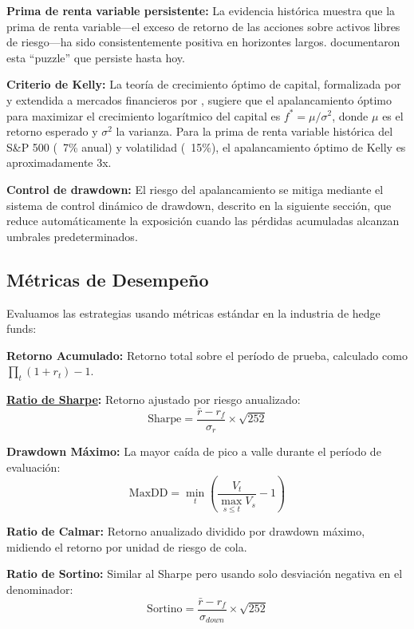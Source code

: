 \documentclass[11pt,a4paper]{article}
\newcommand{\gterm}[2]{\hyperref[glos:#1]{#2}}
\begin{document}
\textbf{Prima de renta variable persistente:} La evidencia histórica muestra que la prima de renta variable---el exceso de retorno de las acciones sobre activos libres de riesgo---ha sido consistentemente positiva en horizontes largos. \citet{mehra1985} documentaron esta ``puzzle'' que persiste hasta hoy.

\textbf{Criterio de Kelly:} La teoría de crecimiento óptimo de capital, formalizada por \citet{kelly1956} y extendida a mercados financieros por \citet{thorp2006}, sugiere que el apalancamiento óptimo para maximizar el crecimiento logarítmico del capital es $f^* = \mu/\sigma^2$, donde $\mu$ es el retorno esperado y $\sigma^2$ la varianza. Para la prima de renta variable histórica del S\&P 500 (~7\% anual) y volatilidad (~15\%), el apalancamiento óptimo de Kelly es aproximadamente 3x.

\textbf{Control de drawdown:} El riesgo del apalancamiento se mitiga mediante el sistema de control dinámico de drawdown, descrito en la siguiente sección, que reduce automáticamente la exposición cuando las pérdidas acumuladas alcanzan umbrales predeterminados.

\subsection{Métricas de Desempeño}

Evaluamos las estrategias usando métricas estándar en la industria de hedge funds:

\textbf{Retorno Acumulado:} Retorno total sobre el período de prueba, calculado como $\prod_t(1+r_t) - 1$.

\textbf{\gterm{sharpe}{Ratio de Sharpe}:} Retorno ajustado por riesgo anualizado:
\begin{equation}
\text{Sharpe} = \frac{\bar{r} - r_f}{\sigma_r} \times \sqrt{252}
\end{equation}

\textbf{Drawdown Máximo:} La mayor caída de pico a valle durante el período de evaluación:
\begin{equation}
\text{MaxDD} = \min_t \left( \frac{V_t}{\max_{s \leq t} V_s} - 1 \right)
\end{equation}

\textbf{Ratio de Calmar:} Retorno anualizado dividido por drawdown máximo, midiendo el retorno por unidad de riesgo de cola.

\textbf{Ratio de Sortino:} Similar al Sharpe pero usando solo desviación negativa en el denominador:
\begin{equation}
\text{Sortino} = \frac{\bar{r} - r_f}{\sigma_{down}} \times \sqrt{252}
\end{equation}
\end{document}
